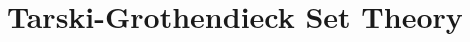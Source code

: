 \documentclass[a4paper,11pt,psamsfonts,reqno]{amsbook}
\newcounter{prpcounter}
\theoremstyle{proposition}
\theoremstyle{proof}
\begin{document}
\newpage



\nocite{c55c71e8}
\nocite{e837ef86}
\nocite{dc6f686f}
\nocite{1ba1603e}
\nocite{52fbba46}
\nocite{8b5861fc}
\nocite{wiki-nlab0000}
\nocite{wiki-pedia0en}






\appendix
\chapter{Tarski-Grothendieck Set Theory}
\label{chap:tg}

\end{document}
